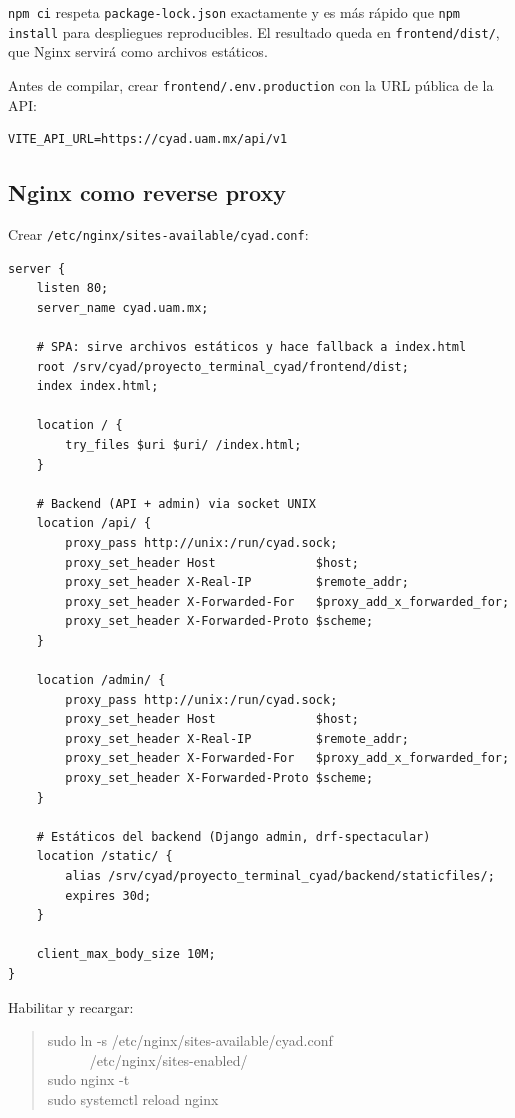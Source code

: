 \documentclass{computacion}
\begin{document}
\texttt{npm ci} respeta \texttt{package-lock.json} exactamente y es más rápido que \texttt{npm install} para despliegues reproducibles. El resultado queda en \texttt{frontend/dist/}, que Nginx servirá como archivos estáticos.

Antes de compilar, crear \texttt{frontend/.env.production} con la URL pública de la API:

\begin{Verbatim}[fontsize=\small, frame=single]
VITE_API_URL=https://cyad.uam.mx/api/v1
\end{Verbatim}

\subsection{Nginx como reverse proxy}

Crear \texttt{/etc/nginx/sites-available/cyad.conf}:

\begin{Verbatim}[fontsize=\small, frame=single]
server {
    listen 80;
    server_name cyad.uam.mx;

    # SPA: sirve archivos estáticos y hace fallback a index.html
    root /srv/cyad/proyecto_terminal_cyad/frontend/dist;
    index index.html;

    location / {
        try_files $uri $uri/ /index.html;
    }

    # Backend (API + admin) via socket UNIX
    location /api/ {
        proxy_pass http://unix:/run/cyad.sock;
        proxy_set_header Host              $host;
        proxy_set_header X-Real-IP         $remote_addr;
        proxy_set_header X-Forwarded-For   $proxy_add_x_forwarded_for;
        proxy_set_header X-Forwarded-Proto $scheme;
    }

    location /admin/ {
        proxy_pass http://unix:/run/cyad.sock;
        proxy_set_header Host              $host;
        proxy_set_header X-Real-IP         $remote_addr;
        proxy_set_header X-Forwarded-For   $proxy_add_x_forwarded_for;
        proxy_set_header X-Forwarded-Proto $scheme;
    }

    # Estáticos del backend (Django admin, drf-spectacular)
    location /static/ {
        alias /srv/cyad/proyecto_terminal_cyad/backend/staticfiles/;
        expires 30d;
    }

    client_max_body_size 10M;
}
\end{Verbatim}

Habilitar y recargar:

\begin{quote}\ttfamily
sudo ln -s /etc/nginx/sites-available/cyad.conf \\
\ \ \ \ \ \ /etc/nginx/sites-enabled/ \\
sudo nginx -t \\
sudo systemctl reload nginx
\end{quote}
\end{document}
